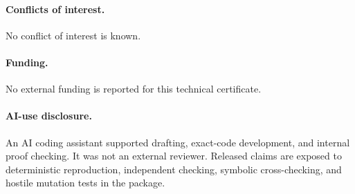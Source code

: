 \documentclass[10pt]{article}
\begin{document}
\paragraph{Conflicts of interest.}
No conflict of interest is known.
\paragraph{Funding.}
No external funding is reported for this technical certificate.
\paragraph{AI-use disclosure.}
An AI coding assistant supported drafting, exact-code development, and
internal proof checking.  It was not an external reviewer.  Released claims
are exposed to deterministic reproduction, independent checking, symbolic
cross-checking, and hostile mutation tests in the package.
\end{document}
